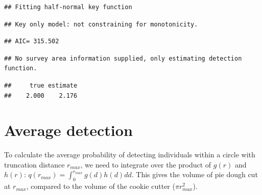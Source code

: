 \documentclass[12pt,]{book}
\newenvironment{Shaded}{\begin{snugshade}}{\end{snugshade}}
\newcommand{\DataTypeTok}[1]{\textcolor[rgb]{0.13,0.29,0.53}{#1}}
\newcommand{\DecValTok}[1]{\textcolor[rgb]{0.00,0.00,0.81}{#1}}
\newcommand{\KeywordTok}[1]{\textcolor[rgb]{0.13,0.29,0.53}{\textbf{#1}}}
\newcommand{\NormalTok}[1]{#1}
\newcommand{\OperatorTok}[1]{\textcolor[rgb]{0.81,0.36,0.00}{\textbf{#1}}}
\newcommand{\OtherTok}[1]{\textcolor[rgb]{0.56,0.35,0.01}{#1}}
\newcommand{\StringTok}[1]{\textcolor[rgb]{0.31,0.60,0.02}{#1}}
\begin{document}
\begin{Shaded}
\end{Shaded}

\begin{verbatim}
## Fitting half-normal key function
\end{verbatim}

\begin{verbatim}
## Key only model: not constraining for monotonicity.
\end{verbatim}

\begin{verbatim}
## AIC= 315.502
\end{verbatim}

\begin{verbatim}
## No survey area information supplied, only estimating detection function.
\end{verbatim}

\begin{Shaded}
\end{Shaded}

\begin{verbatim}
##     true estimate 
##    2.000    2.176
\end{verbatim}

\hypertarget{average-detection}{%
\section{Average detection}\label{average-detection}}

To calculate the average probability of detecting individuals
within a circle with truncation distance \(r_{max}\), we need to
integrate over the product of \(g(r)\) and \(h(r)\):
\(q(r_{max})=\int_{0}^{r_{max}} g(d) h(d) dd\).
This gives the volume of pie dough cut at \(r_{max}\),
compared to the volume of the cookie cutter (\(\pi r_{max}^2\)).
\end{document}
